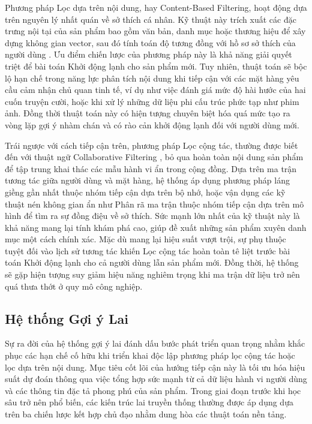 Phương pháp Lọc dựa trên nội dung, hay Content-Based Filtering, hoạt động dựa trên nguyên lý nhất quán về sở thích cá nhân. Kỹ thuật này trích xuất các đặc trưng nội tại của sản phẩm bao gồm văn bản, danh mục hoặc thương hiệu để xây dựng không gian vector, sau đó tính toán độ tương đồng với hồ sơ sở thích của người dùng \cite{18}. Ưu điểm chiến lược của phương pháp này là khả năng giải quyết triệt để bài toán Khởi động lạnh cho sản phẩm mới. Tuy nhiên, thuật toán sẽ bộc lộ hạn chế trong năng lực phân tích nội dung khi tiếp cận với các mặt hàng yêu cầu cảm nhận chủ quan tinh tế, ví dụ như việc đánh giá mức độ hài hước của hai cuốn truyện cười, hoặc khi xử lý những dữ liệu phi cấu trúc phức tạp như phim ảnh. Đồng thời thuật toán này có hiện tượng chuyên biệt hóa quá mức tạo ra vòng lặp gợi ý nhàm chán và có rào cản khởi động lạnh đối với người dùng mới.

Trái ngược với cách tiếp cận trên, phương pháp Lọc cộng tác, thường được biết đến với thuật ngữ Collaborative Filtering \cite{18}, bỏ qua hoàn toàn nội dung sản phẩm để tập trung khai thác các mẫu hành vi ẩn trong cộng đồng. Dựa trên ma trận tương tác giữa người dùng và mặt hàng, hệ thống áp dụng phương pháp láng giềng gần nhất thuộc nhóm tiếp cận dựa trên bộ nhớ, hoặc vận dụng các kỹ thuật nén không gian ẩn như Phân rã ma trận thuộc nhóm tiếp cận dựa trên mô hình để tìm ra sự đồng điệu về sở thích. Sức mạnh lớn nhất của kỹ thuật này là khả năng mang lại tính khám phá cao, giúp đề xuất những sản phẩm xuyên danh mục một cách chính xác. Mặc dù mang lại hiệu suất vượt trội, sự phụ thuộc tuyệt đối vào lịch sử tương tác khiến Lọc cộng tác hoàn toàn tê liệt trước bài toán Khởi động lạnh cho cả người dùng lẫn sản phẩm mới. Đồng thời, hệ thống sẽ gặp hiện tượng suy giảm hiệu năng nghiêm trọng khi ma trận dữ liệu trở nên quá thưa thớt ở quy mô công nghiệp.

\subsection{Hệ thống Gợi ý Lai}

Sự ra đời của hệ thống gợi ý lai đánh dấu bước phát triển quan trọng nhằm khắc phục các hạn chế cố hữu khi triển khai độc lập phương pháp lọc cộng tác hoặc lọc dựa trên nội dung. Mục tiêu cốt lõi của hướng tiếp cận này là tối ưu hóa hiệu suất dự đoán thông qua việc tổng hợp sức mạnh từ cả dữ liệu hành vi người dùng và các thông tin đặc tả phong phú của sản phẩm. Trong giai đoạn trước khi học sâu trở nên phổ biến, các kiến trúc lai truyền thống thường được áp dụng dựa trên ba chiến lược kết hợp chủ đạo nhằm dung hòa các thuật toán nền tảng.

